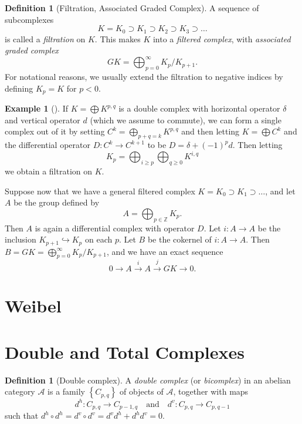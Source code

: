 \documentclass[reqno]{amsart}
\theoremstyle{definition}
\newtheorem{definition}[theorem]{Definition}
\newtheorem{example}[theorem]{Example}
\theoremstyle{remark}
\begin{document}
\begin{definition}[Filtration, Associated Graded Complex]
    A sequence of subcomplexes
    \[
    K = K_0 \supset K_1 \supset K_2 \supset K_3 \supset
    \ldots
    \] 
    is called a \textit{filtration} on $K$.
    This makes $K$ into a \textit{filtered complex}, with
    \textit{associated graded complex}
    \[
    GK = \bigoplus_{p=0}^{\infty} K_p / K_{p+1}.
    \] 
    For notational reasons, we usually extend the
    filtration to negative indices
    by defining
    $K_p = K$ for $p < 0$.
\end{definition}

\begin{example}[]
    If $K = \bigoplus K^{p,q}$ is a double complex with
    horizontal operator $\delta$ and vertical operator
    $d$ (which we assume
    to commute), we can form a single complex out of it by
    setting $C^{k} = \bigoplus_{p+q=k} K^{p,q}$ and
    then letting
    $K = \bigoplus C^{k}$ and
    the differential operator
    $D \colon C^{k} \to C^{k+1}$ to be
    $D = \delta + (-1)^{p} d$. 
    Then letting
    \[
    K_p = \bigoplus_{i\ge p} \bigoplus_{q \ge 0}
    K^{i,q}
    \] 
    we obtain a filtration on
    $K$.
\end{example}




Suppose now that we have a general filtered
complex $K
= K_0 \supset K_1 \supset \ldots$, and let $A$ be the group defined
by
\[
A = \bigoplus_{p \in \mathbb{Z}} K_p.
\] 
Then $A$ is again a differential complex with
operator $D$.
Let $i \colon A \to A$ be the inclusion
$K_{p+1} \hookrightarrow K_{p}$ on each $p$.
Let $B$ be the cokernel of $i \colon A \to A$.
Then $B = GK =
\bigoplus_{p=0}^{\infty} K_p / K_{p+1}$, and
we have an exact sequence
\[
0 \to A \stackrel{i}{\to} A
\stackrel{j}{\to} GK \to 0.
\] 






\newpage
\section{Weibel}


\section{Double and Total Complexes}

\begin{definition}[Double complex]
    A \textit{double complex} (or \textit{bicomplex}) in
    an abelian category $\mathcal{A}$ is a family
    $\left\{ C_{p,q} \right\} $ of objects of $\mathcal{A}$,
    together with maps
    \[
    d^{h} \colon C_{p,q} \to C_{p-1,q} \quad
    \text{and} \quad
    d^{v} \colon C_{p,q} \to C_{p,q-1}
    \] 
    such that $d^{h} \circ d^{h} =
    d^{v} \circ d^{v} = d^{v} d^{h} +
    d^{h} d^{v} = 0$.
\end{definition}
\end{document}
